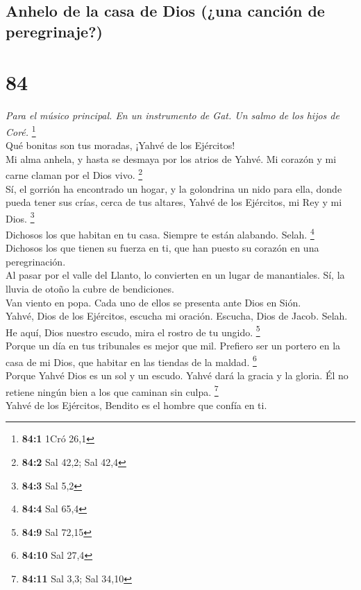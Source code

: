 \hypertarget{anhelo-de-la-casa-de-dios-una-canciuxf3n-de-peregrinaje}{%
\subsection{Anhelo de la casa de Dios (¿una canción de
peregrinaje?)}\label{anhelo-de-la-casa-de-dios-una-canciuxf3n-de-peregrinaje}}

\hypertarget{section-81}{%
\section{84}\label{section-81}}

\emph{Para el músico principal. En un instrumento de Gat. Un salmo de
los hijos de Coré.} \footnote{\textbf{84:1} 1Cró 26,1}\\
 Qué bonitas son tus moradas, ¡Yahvé de los Ejércitos!\\
 Mi alma anhela, y hasta se desmaya por los atrios de
Yahvé. Mi corazón y mi carne claman por el Dios vivo. \footnote{\textbf{84:2}
  Sal 42,2; Sal 42,4}\\
 Sí, el gorrión ha encontrado un hogar, y la golondrina un
nido para ella, donde pueda tener sus crías, cerca de tus altares, Yahvé
de los Ejércitos, mi Rey y mi Dios. \footnote{\textbf{84:3} Sal 5,2}\\
 Dichosos los que habitan en tu casa. Siempre te están
alabando. Selah. \footnote{\textbf{84:4} Sal 65,4}\\
 Dichosos los que tienen su fuerza en ti, que han puesto
su corazón en una peregrinación.\\
 Al pasar por el valle del Llanto, lo convierten en un
lugar de manantiales. Sí, la lluvia de otoño la cubre de bendiciones.\\
 Van viento en popa. Cada uno de ellos se presenta ante
Dios en Sión.\\
 Yahvé, Dios de los Ejércitos, escucha mi oración.
Escucha, Dios de Jacob. Selah.\\
 He aquí, Dios nuestro escudo, mira el rostro de tu
ungido. \footnote{\textbf{84:9} Sal 72,15}\\
 Porque un día en tus tribunales es mejor que mil.
Prefiero ser un portero en la casa de mi Dios, que habitar en las
tiendas de la maldad. \footnote{\textbf{84:10} Sal 27,4}\\
 Porque Yahvé Dios es un sol y un escudo. Yahvé dará la
gracia y la gloria. Él no retiene ningún bien a los que caminan sin
culpa. \footnote{\textbf{84:11} Sal 3,3; Sal 34,10}\\
 Yahvé de los Ejércitos, Bendito es el hombre que confía
en ti.

